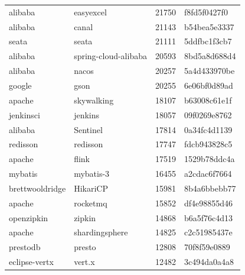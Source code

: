 \begin{longtable}{l | l | l | l}
    alibaba             & easyexcel                 & 21750 & f8fd5f0427f0                            \\
    alibaba             & canal                     & 21143 & b54bea5e3337                            \\
    seata               & seata                     & 21111 & 5ddfbc1f3cb7                            \\
    alibaba             & spring-cloud-alibaba      & 20593 & 8bd5a8d688d4                            \\
    alibaba             & nacos                     & 20257 & 5a4d433970be                            \\
    google              & gson                      & 20255 & 6e06bf0d89ad                            \\
    apache              & skywalking                & 18107 & b63008c61e1f                            \\
    jenkinsci           & jenkins                   & 18057 & 09f0269e8762                            \\
    alibaba             & Sentinel                  & 17814 & 0a34fc4d1139                            \\
    redisson            & redisson                  & 17747 & fdcb943828c5                            \\
    apache              & flink                     & 17519 & 1529b78ddc4a                            \\
    mybatis             & mybatis-3                 & 16455 & a2cdac6f7664                            \\
    brettwooldridge     & HikariCP                  & 15981 & 8b4a6bbebb77                            \\
    apache              & rocketmq                  & 15852 & df4e98855d46                            \\
    openzipkin          & zipkin                    & 14868 & b6a5f76c4d13                            \\
    apache              & shardingsphere            & 14825 & c2c51985437e                            \\
    prestodb            & presto                    & 12808 & 70f8f59e0889                            \\
    eclipse-vertx       & vert.x                    & 12482 & 3c494da0a4a8                            \\

\end{longtable}
